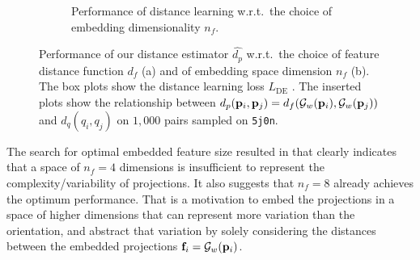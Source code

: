 \begin{figure}[ht]
\begin{subfigure}[t]{0.52\linewidth}
        \caption{%
            Performance of distance learning w.r.t.\ the choice of embedding dimensionality $n_f$.
        }\label{fig:4d-vs-256d-de}
    \end{subfigure}
        \caption{%
            Performance of our distance estimator $\widehat{d_p}$ w.r.t.\ the choice of feature distance function $d_f$ (a) and of embedding space dimension $n_f$ (b). 
            The box plots show the distance learning loss $L_\text{DE}$ .
            The inserted plots show the relationship between $d_p(\mathbf{p}_i, \mathbf{p}_j) = d_f(\mathcal{G}_w(\mathbf{p}_i), \mathcal{G}_w(\mathbf{p}_j))$ and $d_q(q_i, q_j)$ on $1,000$ pairs sampled on \texttt{5j0n}.
        }
\end{figure}

The search for optimal embedded feature size resulted in  that clearly indicates that a space of $n_f=4$ dimensions is insufficient to represent the complexity/variability of projections. It also suggests that $n_f=8$ already achieves the optimum performance.
That is a motivation to embed the projections in a space of higher dimensions that can represent more variation than the orientation, and abstract that variation by solely considering the distances between the embedded projections $\mathbf{f}_i = \mathcal{G}_w(\mathbf{p}_i)$.


